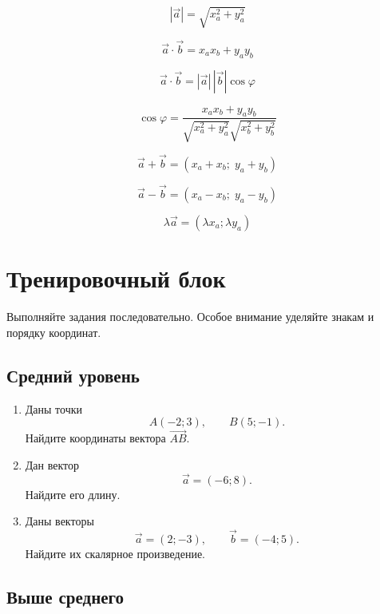 \documentclass[a4paper,12pt]{article}
\newcommand{\vect}[1]{\overrightarrow{#1}}
\newcommand{\dotprod}{\mathbin{\cdot}}
\begin{document}
\[
\boxed{
|\vec a|
=
\sqrt{x_a^2+y_a^2}
}
\]

\[
\boxed{
\vec a\dotprod\vec b
=
x_a x_b+y_a y_b
}
\]

\[
\boxed{
\vec a\dotprod\vec b
=
|\vec a|\,|\vec b|\cos\varphi
}
\]

\[
\boxed{
\cos\varphi
=
\frac{x_a x_b+y_a y_b}
{\sqrt{x_a^2+y_a^2}\sqrt{x_b^2+y_b^2}}
}
\]

\[
\boxed{
\vec a+\vec b
=
(x_a+x_b;\;y_a+y_b)
}
\]

\[
\boxed{
\vec a-\vec b
=
(x_a-x_b;\;y_a-y_b)
}
\]

\[
\boxed{
\lambda\vec a
=
(\lambda x_a;\lambda y_a)
}
\]

\clearpage


\section*{\color{darkaccent}Тренировочный блок}

Выполняйте задания последовательно. Особое внимание уделяйте знакам и порядку координат.

\subsection*{Средний уровень}

\begin{enumerate}[label=\textbf{\arabic*.}]

\item
Даны точки
\[
A(-2;3),
\qquad
B(5;-1).
\]
Найдите координаты вектора \(\vect{AB}\).

\item
Дан вектор
\[
\vec a=(-6;8).
\]
Найдите его длину.

\item
Даны векторы
\[
\vec a=(2;-3),
\qquad
\vec b=(-4;5).
\]
Найдите их скалярное произведение.

\end{enumerate}

\subsection*{Выше среднего}
\end{document}
